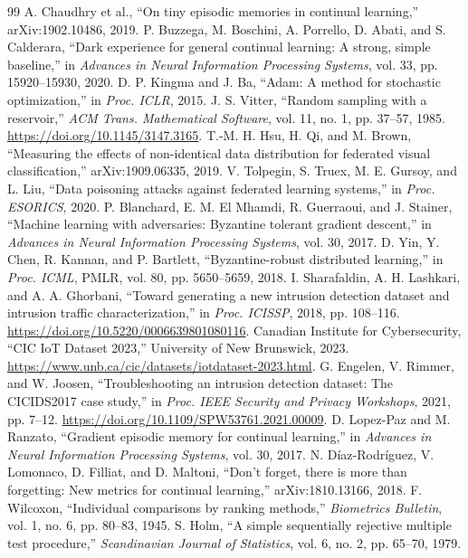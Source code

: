 \documentclass[10pt,a4paper]{article}
\begin{document}
\begin{thebibliography}{99}
 A. Chaudhry et al., \enquote{On tiny episodic memories in continual learning,} arXiv:1902.10486, 2019.
 P. Buzzega, M. Boschini, A. Porrello, D. Abati, and S. Calderara, \enquote{Dark experience for general continual learning: A strong, simple baseline,} in \emph{Advances in Neural Information Processing Systems}, vol. 33, pp. 15920--15930, 2020.
 D. P. Kingma and J. Ba, \enquote{Adam: A method for stochastic optimization,} in \emph{Proc. ICLR}, 2015.
 J. S. Vitter, \enquote{Random sampling with a reservoir,} \emph{ACM Trans. Mathematical Software}, vol. 11, no. 1, pp. 37--57, 1985. \url{https://doi.org/10.1145/3147.3165}.
 T.-M. H. Hsu, H. Qi, and M. Brown, \enquote{Measuring the effects of non-identical data distribution for federated visual classification,} arXiv:1909.06335, 2019.
 V. Tolpegin, S. Truex, M. E. Gursoy, and L. Liu, \enquote{Data poisoning attacks against federated learning systems,} in \emph{Proc. ESORICS}, 2020.
 P. Blanchard, E. M. El Mhamdi, R. Guerraoui, and J. Stainer, \enquote{Machine learning with adversaries: Byzantine tolerant gradient descent,} in \emph{Advances in Neural Information Processing Systems}, vol. 30, 2017.
 D. Yin, Y. Chen, R. Kannan, and P. Bartlett, \enquote{Byzantine-robust distributed learning,} in \emph{Proc. ICML}, PMLR, vol. 80, pp. 5650--5659, 2018.
 I. Sharafaldin, A. H. Lashkari, and A. A. Ghorbani, \enquote{Toward generating a new intrusion detection dataset and intrusion traffic characterization,} in \emph{Proc. ICISSP}, 2018, pp. 108--116. \url{https://doi.org/10.5220/0006639801080116}.
 Canadian Institute for Cybersecurity, \enquote{CIC IoT Dataset 2023,} University of New Brunswick, 2023. \url{https://www.unb.ca/cic/datasets/iotdataset-2023.html}.
 G. Engelen, V. Rimmer, and W. Joosen, \enquote{Troubleshooting an intrusion detection dataset: The CICIDS2017 case study,} in \emph{Proc. IEEE Security and Privacy Workshops}, 2021, pp. 7--12. \url{https://doi.org/10.1109/SPW53761.2021.00009}.
 D. Lopez-Paz and M. Ranzato, \enquote{Gradient episodic memory for continual learning,} in \emph{Advances in Neural Information Processing Systems}, vol. 30, 2017.
 N. D\'iaz-Rodr\'iguez, V. Lomonaco, D. Filliat, and D. Maltoni, \enquote{Don't forget, there is more than forgetting: New metrics for continual learning,} arXiv:1810.13166, 2018.
 F. Wilcoxon, \enquote{Individual comparisons by ranking methods,} \emph{Biometrics Bulletin}, vol. 1, no. 6, pp. 80--83, 1945.
 S. Holm, \enquote{A simple sequentially rejective multiple test procedure,} \emph{Scandinavian Journal of Statistics}, vol. 6, no. 2, pp. 65--70, 1979.
\end{thebibliography}
\end{document}
